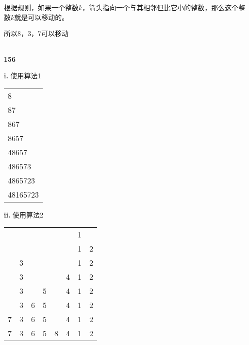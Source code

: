 \documentclass[UTF8]{ctexart}
\begin{document}
根据规则，如果一个整数$k$，箭头指向一个与其相邻但比它小的整数，那么这个整数$k$就是可以移动的。

所以8，3，7可以移动

~\\
\noindent \textbf{156}

\textbf{i. }使用算法1
\begin{table}[h]
\centering
\begin{tabular}{l}
8         \\
87        \\
867       \\
8657      \\
48657     \\
486573    \\
4865723   \\
48165723 
\end{tabular}
\end{table}

\textbf{ii. }使用算法2

\begin{table}[h]
\centering
\begin{tabular}{llllllll}
  &   &   &   &   &   & 1 &    \\
  &   &   &   &   &   & 1 & 2  \\
  & 3 &   &   &   &   & 1 & 2  \\
  & 3 &   &   &   & 4 & 1 & 2  \\
  & 3 &   & 5 &   & 4 & 1 & 2  \\
  & 3 & 6 & 5 &   & 4 & 1 & 2  \\
7 & 3 & 6 & 5 &   & 4 & 1 & 2  \\
7 & 3 & 6 & 5 & 8 & 4 & 1 & 2 
\end{tabular}
\end{table}
\end{document}

